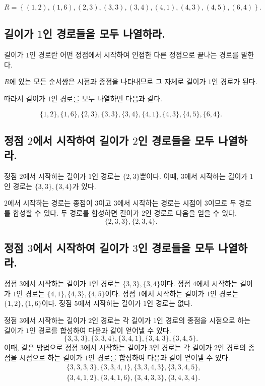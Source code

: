 \documentclass{oblivoir}
\begin{document}
\begin{equation}
    R = \left\{ (1,2), (1,6), (2,3), (3,3), (3,4), (4,1), (4,3), (4,5), (6,4) \right\}.
\end{equation}

\subsection{길이가 $1$인 경로들을 모두 나열하라.}

길이가 $1$인 경로란 어떤 정점에서 시작하여 인접한
다른 정점으로 끝나는 경로를 말한다.

$R$에 있는 모든 순서쌍은 시점과 종점을 나타내므로
그 자체로 길이가 $1$인 경로가 된다.

따라서 길이가 $1$인 경로를 모두 나열하면 다음과 같다.

\begin{equation}
    \{1,2\}, \{1,6\}, \{2,3\}, \{3,3\}, \{3,4\}, \{4,1\}, \{4,3\}, \{4,5\}, \{6,4\}.
\end{equation}

\subsection{정점 $2$에서 시작하여 길이가 $2$인 경로들을 모두 나열하라.}

정점 $2$에서 시작하는 길이가 $1$인 경로는 $\{2,3\}$뿐이다.
이때, $3$에서 시작하는 길이가 $1$인 경로는 $\{3,3\}, \{3,4\}$가 있다.

$2$에서 시작하는 경로는 종점이 $3$이고
$3$에서 시작하는 경로는 시점이 $3$이므로 두 경로를 합성할 수 있다.
두 경로를 합성하면 길이가 $2$인 경로로 다음을 얻을 수 있다.
\begin{equation}
    \{2,3,3\}, \{2,3,4\}.
\end{equation}

\subsection{정점 $3$에서 시작하여 길이가 $3$인 경로들을 모두 나열하라.}

정점 $3$에서 시작하는 길이가 $1$인 경로는 $\{3,3\}, \{3,4\}$이다.
정점 $4$에서 시작하는 길이가 $1$인 경로는 $\{4,1\}, \{4,3\}, \{4,5\}$이다.
정점 $1$에서 시작하는 길이가 $1$인 경로는 $\{1,2\}, \{1,6\}$이다.
정점 $5$에서 시작하는 길이가 $1$인 경로는 없다.

정점 $3$에서 시작하는 길이가 $2$인 경로는
각 길이가 $1$인 경로의 종점을 시점으로 하는 길이가 $1$인 경로를
합성하여 다음과 같이 얻어낼 수 있다.
\begin{equation}
    \{3,3,3\}, \{3,3,4\}, \{3,4,1\}, \{3,4,3\}, \{3,4,5\}.
\end{equation}
이때, 같은 방법으로 정점 $3$에서 시작하는 길이가 $3$인 경로는
각 길이가 $2$인 경로의 종점을 시점으로 하는 길이가 $1$인 경로를
합성하여 다음과 같이 얻어낼 수 있다.
\begin{equation}
    \begin{aligned}
        &\{3,3,3,3\}, \{3,3,4,1\}, \{3,3,4,3\}, \{3,3,4,5\}, \\
        &\{3,4,1,2\}, \{3,4,1,6\}, \{3,4,3,3\}, \{3,4,3,4\}.
    \end{aligned}
\end{equation}
\end{document}
